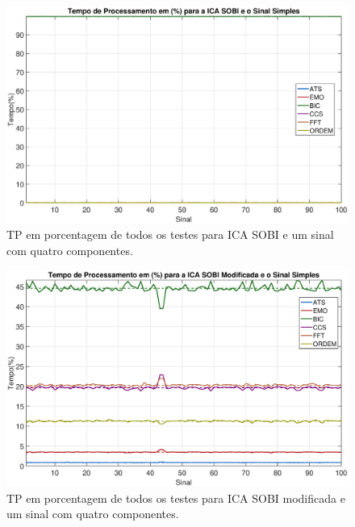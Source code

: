 \documentclass[a4paper,12pt]{monografia}
\theoremstyle{plain}
\theoremstyle{definition}
\theoremstyle{remark}
\begin{document}
\begin{figure}[!htb]
    \begin{center}
    \advance\leftskip -1.5cm
    \includegraphics[scale=0.45]{imagens/ImagensParaOAnexo/TPPEICASOBISinalSimples.eps}
    \caption{TP em porcentagem de todos os testes para ICA SOBI e um sinal com quatro componentes.}
    \label{fig:TPSSSinalsimples}    
    \end{center}
\end{figure}

\begin{figure}[!htb]
    \begin{center}
    \advance\leftskip -1.5cm
    \includegraphics[scale=0.45]{imagens/ImagensParaOAnexo/TPPEICASOBImodSinalSimples.eps}
    \caption{TP em porcentagem de todos os testes para ICA SOBI modificada e um sinal com quatro componentes.}
    \label{fig:TPSMSinalsimples}    
    \end{center}
\end{figure}
\end{document}
